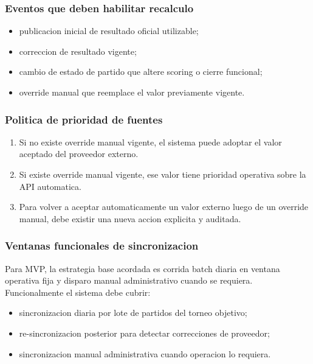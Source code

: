 \subsubsection{Eventos que deben habilitar recalculo}

\begin{itemize}
  \item publicacion inicial de resultado oficial utilizable;
  \item correccion de resultado vigente;
  \item cambio de estado de partido que altere scoring o cierre funcional;
  \item override manual que reemplace el valor previamente vigente.
\end{itemize}

\subsubsection{Politica de prioridad de fuentes}

\begin{enumerate}
  \item Si no existe override manual vigente, el sistema puede adoptar el valor aceptado del proveedor externo.
  \item Si existe override manual vigente, ese valor tiene prioridad operativa sobre la API automatica.
  \item Para volver a aceptar automaticamente un valor externo luego de un override manual, debe existir una nueva accion explicita y auditada.
\end{enumerate}

\subsubsection{Ventanas funcionales de sincronizacion}

Para MVP, la estrategia base acordada es corrida batch diaria en ventana operativa fija y disparo manual administrativo cuando se requiera. Funcionalmente el sistema debe cubrir:

\begin{itemize}
  \item sincronizacion diaria por lote de partidos del torneo objetivo;
  \item re-sincronizacion posterior para detectar correcciones de proveedor;
  \item sincronizacion manual administrativa cuando operacion lo requiera.
\end{itemize}

